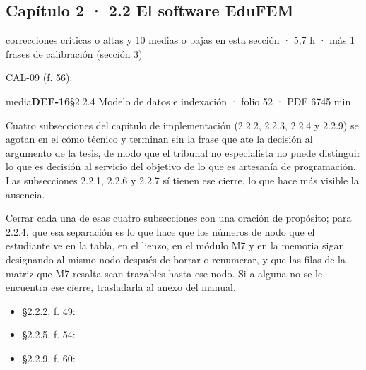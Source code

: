 \subsection{Capítulo 2 · 2.2 El software EduFEM}
{\small\color{gris} correcciones críticas o altas y 10 medias o bajas en esta sección · 5,7 h · más 1 frases de calibración (sección 3)}\par
{\small{}CAL-09 (f. 56).\par}
{\small{}\par}
\begin{ficha}{media}{\casilla\textbf{DEF-16}\quad{}\quad §2.2.4 Modelo de datos e indexación · folio 52 · PDF 67\hfill 45 min}
\par
{}Cuatro subsecciones del capítulo de implementación (2.2.2, 2.2.3, 2.2.4 y 2.2.9) se agotan en el cómo técnico y terminan sin la frase que ate la decisión al argumento de la tesis, de modo que el tribunal no especialista no puede distinguir lo que es decisión al servicio del objetivo de lo que es artesanía de programación. Las subsecciones 2.2.1, 2.2.6 y 2.2.7 sí tienen ese cierre, lo que hace más visible la ausencia.\par
{}Cerrar cada una de esas cuatro subsecciones con una oración de propósito; para 2.2.4, que esa separación es lo que hace que los números de nodo que el estudiante ve en la tabla, en el lienzo, en el módulo M7 y en la memoria sigan designando al mismo nodo después de borrar o renumerar, y que las filas de la matriz que M7 resalta sean trazables hasta ese nodo. Si a alguna no se le encuentra ese cierre, trasladarla al anexo del manual.\par
{}\begin{itemize}[leftmargin=1.2em,itemsep=1pt,topsep=1pt]
\item {\small §2.2.2, f. 49: }
\item {\small §2.2.5, f. 54: }
\item {\small §2.2.9, f. 60: }
\end{itemize}
\end{ficha}
